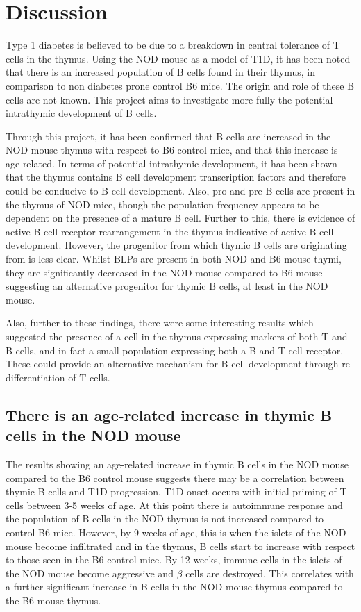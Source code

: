 
\chapter{Discussion}

Type 1 diabetes is believed to be due to a breakdown in central tolerance of T cells in the thymus.
Using the NOD mouse as a model of T1D, it has been noted that there is an increased population of B cells found in their thymus, in comparison to non diabetes prone control B6 mice.
The origin and role of these B cells are not known.
This project aims to investigate more fully the potential intrathymic development of B cells.

Through this project, it has been confirmed that B cells are increased in the NOD mouse thymus with respect to B6 control mice, and that this increase is age-related.
In terms of potential intrathymic development, it has been shown that the thymus contains B cell development transcription factors and therefore could be conducive to B cell development.
Also, pro and pre B cells are present in the thymus of NOD mice, though the population frequency appears to be dependent on the presence of a mature B cell.
Further to this, there is evidence of active B cell receptor rearrangement in the thymus indicative of active B cell development.
However, the progenitor from which thymic B cells are originating from is less clear. 
Whilst BLPs are present in both NOD and B6 mouse thymi, they are significantly decreased in the NOD mouse compared to B6 mouse suggesting an alternative progenitor for thymic B cells, at least in the NOD mouse.

Also, further to these findings, there were some interesting results which suggested the presence of a cell in the thymus expressing markers of both T and B cells, and in fact a small population expressing both a B and T cell receptor.
These could provide an alternative mechanism for B cell development through re-differentiation of T cells.


\section{There is an age-related increase in thymic B cells in the NOD mouse}

The results showing an age-related increase in thymic B cells in the NOD mouse compared to the B6 control mouse suggests there may be a correlation between thymic B cells and T1D progression.
T1D onset occurs with initial priming of T cells between 3-5 weeks of age. 
At this point there is autoimmune response and the population of B cells in the NOD thymus is not increased compared to control B6 mice.
However, by 9 weeks of age, this is when the islets of the NOD mouse become infiltrated and in the thymus, B cells start to increase with respect to those seen in the B6 control mice.
By 12 weeks, immune cells in the islets of the NOD mouse become aggressive and $\beta$ cells are destroyed. 
This correlates with a further significant increase in B cells in the NOD mouse thymus compared to the B6 mouse thymus.


